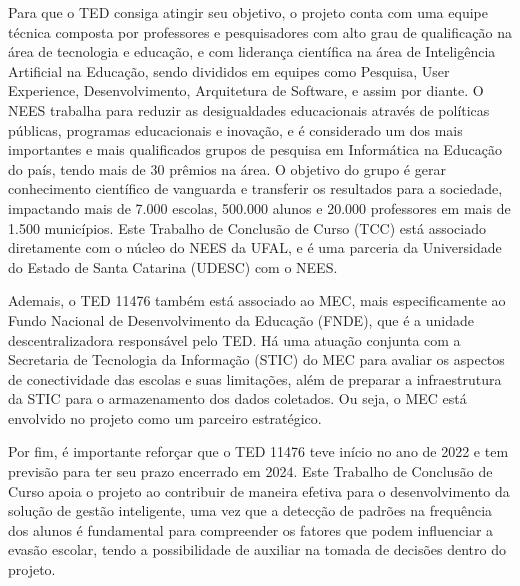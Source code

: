 Para que o TED consiga atingir seu objetivo, o projeto conta com uma equipe técnica composta por professores e pesquisadores com alto grau de qualificação na área de tecnologia e educação, e com liderança científica na área de Inteligência Artificial na Educação, sendo divididos em equipes como Pesquisa, User Experience, Desenvolvimento, Arquitetura de Software, e assim por diante. %
O NEES trabalha para reduzir as desigualdades educacionais através de políticas públicas, programas educacionais e inovação, e é considerado um dos mais importantes e mais qualificados grupos de pesquisa em Informática na Educação do país, tendo mais de 30 prêmios na área. O objetivo do grupo é gerar conhecimento científico de vanguarda e transferir os resultados para a sociedade, impactando mais de 7.000 escolas, 500.000 alunos e 20.000 professores em mais de 1.500 municípios. Este Trabalho de Conclusão de Curso (TCC) está associado diretamente com o núcleo do NEES da UFAL, e é uma parceria da Universidade do Estado de Santa Catarina (UDESC) com o NEES. %

Ademais, o TED 11476 também está associado ao MEC, mais especificamente ao Fundo Nacional de Desenvolvimento da Educação (FNDE), que é a unidade descentralizadora responsável pelo TED. Há uma atuação conjunta com a Secretaria de Tecnologia da Informação (STIC) do MEC para avaliar os aspectos de conectividade das escolas e suas limitações, além de preparar a infraestrutura da STIC para o armazenamento dos dados coletados. Ou seja, o MEC está envolvido no projeto como um parceiro estratégico.

Por fim, é importante reforçar que o TED 11476 teve início no ano de 2022 e tem previsão para ter seu prazo encerrado em 2024. Este Trabalho de Conclusão de Curso apoia o projeto ao contribuir de maneira efetiva para o desenvolvimento da solução de gestão inteligente, uma vez que a detecção de padrões na frequência dos alunos é fundamental para compreender os fatores que podem influenciar a evasão escolar, tendo a possibilidade de auxiliar na tomada de decisões dentro do projeto.

